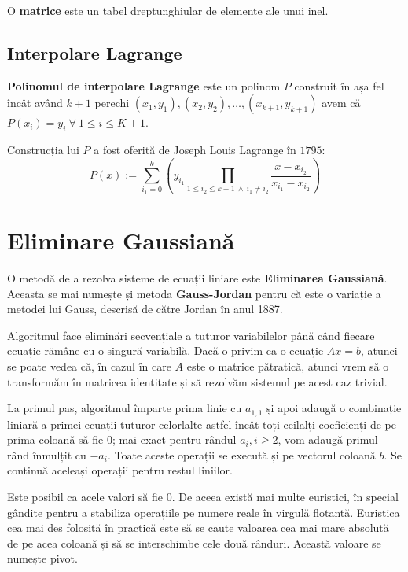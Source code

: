 \begin{defn}
  O \textbf{matrice} este un tabel dreptunghiular de elemente ale unui inel.
\end{defn}

\subsection{Interpolare Lagrange}

\textbf{Polinomul de interpolare Lagrange} este un polinom $P$ construit în așa
fel încât având $k + 1$ perechi
$(x_{1}, y_{1}), (x_{2}, y_{2}), \ldots, (x_{k+1}, y_{k+1})$ avem că
$P(x_{i}) = y_{i}\ \forall\ 1 \leq i \leq K + 1$. \par
Construcția lui $P$ a fost oferită de Joseph Louis Lagrange în $1795$:
\begin{equation}
  P(x) := \displaystyle\sum\limits_{i_{1}=0}^{k} (y_{i_{1}} \prod_{1 \leq i_{2} \leq k + 1 \ \land \ i_{1} \neq i_{2}} \frac{x - x_{i_{2}}}{x_{i_{1}} - x_{i_{2}}})
\end{equation}

\section{Eliminare Gaussiană}
\label{gauss}

O metodă de a rezolva sisteme de ecuații liniare este \textbf{Eliminarea Gaussiană}.
Aceasta se mai numește și metoda \textbf{Gauss-Jordan} pentru că este o variație a
metodei lui Gauss, descrisă de către Jordan în anul 1887.

Algoritmul face eliminări secvențiale a tuturor variabilelor până când fiecare ecuație
rămâne cu o singură variabilă. Dacă o privim ca o ecuație $Ax = b$, atunci se poate
vedea că, în cazul în care $A$ este o matrice pătratică, atunci vrem să o transformăm
în matricea identitate și să rezolvăm sistemul pe acest caz trivial.

La primul pas, algoritmul împarte prima linie cu $a_{1, 1}$ și apoi adaugă o combinație
liniară a primei ecuații tuturor celorlalte astfel încât toți ceilalți coeficienți de pe
prima coloană să fie $0$; mai exact pentru rândul $a_{i}, i \geq 2$, vom adaugă primul rând
înmulțit cu $-a_{i}$. Toate aceste operații se execută și pe vectorul coloană $b$. Se
continuă aceleași operații pentru restul liniilor.

Este posibil ca acele valori să fie $0$. De aceea există mai multe euristici, în special gândite
pentru a stabiliza operațiile pe numere reale în virgulă flotantă. Euristica cea mai des folosită
în practică este să se caute valoarea cea mai mare absolută de pe acea coloană și să se interschimbe
cele două rânduri. Această valoare se numește pivot.

